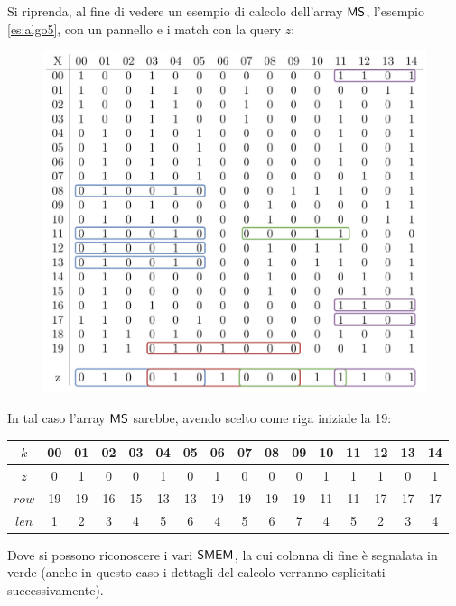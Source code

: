 \begin{esempio}
  \label{es:ms}
  Si riprenda, al fine di vedere un esempio di calcolo dell'array $\mbox{\rm {\sf MS}}$,
  l'esempio \ref{es:algo5}, con un pannello e i match con 
  la query $z$:
  \begin{figure}[H]
    \centering
    \includegraphics[scale = 0.365]{img/pbwtmatch.pdf}
  \end{figure}
  In tal caso l'array $\mbox{\rm {\sf MS}}$ sarebbe, avendo scelto come riga iniziale la 19:
  \begin{table}[H]
    \footnotesize{}
    \centering
    \begin{tabular}{c|ccccccccccccccc}
      $k$ & 00 & 01 & 02 & 03 & 04 &  {\color{nordgreen}05} & 06 & 07 & 08
      &  {\color{nordgreen}09} & 10 &  {\color{nordgreen}11} & 12 & 13
      &  {\color{nordgreen}14} \\
      \hline
      \hline
      $z$ & 0 & 1 & 0 & 0 & 1 &  {\color{nordgreen}0} & 1 & 0 & 0
      &  {\color{nordgreen}0} & 1 &  {\color{nordgreen}1} & 1 & 0
      &  {\color{nordgreen}1} \\
      \hline
      $row$ & 19 & 19 & 16 & 15 & 13 &  {\color{nordgreen}13} & 19 & 19 & 19
      &  {\color{nordgreen}19} & 11 &  {\color{nordgreen}11} & 17 & 17
      &  {\color{nordgreen}17} \\
      $len$ & 1 & 2 & 3 & 4 & 5 & {\color{nordgreen}6} & 4 & 5 & 6
      & {\color{nordgreen}7} & 4 & {\color{nordgreen}5} & 2 & 3
      & {\color{nordgreen}4}\\
    \end{tabular}
  \end{table}
  Dove si possono riconoscere i vari $\mbox{\rm {\sf SMEM}}$, la cui colonna di fine è
  segnalata in verde (anche in questo caso i dettagli del calcolo
  verranno esplicitati successivamente). 
\end{esempio}
